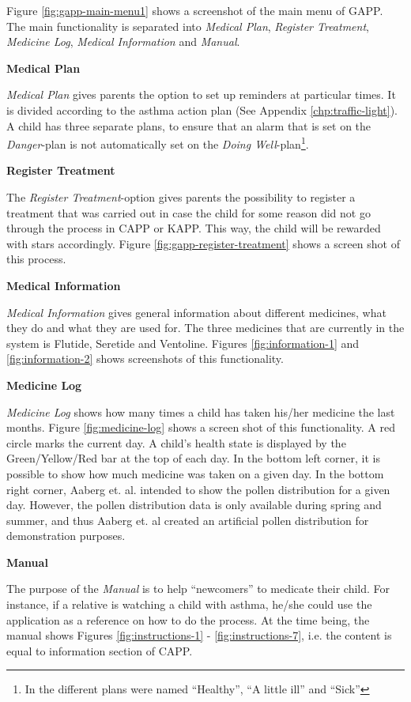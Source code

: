 Figure \ref{fig:gapp-main-menu1} shows a screenshot of the main menu of GAPP. The main functionality is separated into 
\emph{Medical Plan}, \emph{Register Treatment}, \emph{Medicine Log}, \emph{Medical Information} and \emph{Manual}. 

\textbf{Medical Plan}

\emph{Medical Plan} gives parents the option to set up reminders at particular times. It is divided according to the asthma action plan (See Appendix \ref{chp:traffic-light}). A child has three separate plans, to ensure that an alarm that is set on the \emph{Danger}-plan is not automatically set on the \emph{Doing Well}-plan\footnote{In \app{} the different plans were named ``Healthy'', ``A little ill'' and ``Sick''}.   

\textbf{Register Treatment}

The \emph{Register Treatment}-option gives parents the possibility to register a treatment that was carried out in case the child for some reason did not go through the process in CAPP or KAPP. This way, the child will be rewarded with stars accordingly. Figure \ref{fig:gapp-register-treatment} shows a screen shot of this process.  

\textbf{Medical Information}

\emph{Medical Information} gives general information about different medicines, what they do and what they are used for. The three medicines that are currently in the system is Flutide, Seretide and Ventoline. Figures \ref{fig:information-1} and \ref{fig:information-2} shows screenshots of this functionality.

\textbf{Medicine Log}

\emph{Medicine Log} shows how many times a child has taken his/her medicine the last months. Figure \ref{fig:medicine-log} shows a screen shot of this functionality. A red circle marks the current day. A child's health state is displayed by the Green/Yellow/Red bar at the top of each day. In the bottom left corner, it is possible to show how much medicine was taken on a given day.
In the bottom right corner, Aaberg et. al. intended to show the pollen distribution for a given day. However, the pollen distribution data is only available during spring and summer, and thus Aaberg et. al created an artificial pollen distribution for demonstration purposes. 

\textbf{Manual}

The purpose of the \emph{Manual} is to help ``newcomers'' to medicate their child. For instance, if a relative is watching a child with asthma, he/she could use the application as a reference on how to do the process. At the time being, the manual shows Figures \ref{fig:instructions-1} - \ref{fig:instructions-7}, i.e. the content is equal to information section of CAPP. 
        
